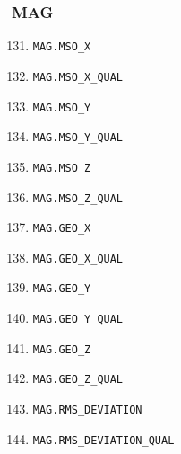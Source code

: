\documentclass{article}
\begin{document}
\subsubsection{MAG}
\begin{enumerate}
\setcounter{enumi}{130}
    \item \texttt{MAG.MSO\_X}
    \item \texttt{MAG.MSO\_X\_QUAL}
    \item \texttt{MAG.MSO\_Y}
    \item \texttt{MAG.MSO\_Y\_QUAL}
    \item \texttt{MAG.MSO\_Z}
    \item \texttt{MAG.MSO\_Z\_QUAL}
    \item \texttt{MAG.GEO\_X}
    \item \texttt{MAG.GEO\_X\_QUAL}
    \item \texttt{MAG.GEO\_Y}
    \item \texttt{MAG.GEO\_Y\_QUAL}
    \item \texttt{MAG.GEO\_Z}
    \item \texttt{MAG.GEO\_Z\_QUAL}
    \item \texttt{MAG.RMS\_DEVIATION}
    \item \texttt{MAG.RMS\_DEVIATION\_QUAL}
\end{enumerate}
\end{document}
